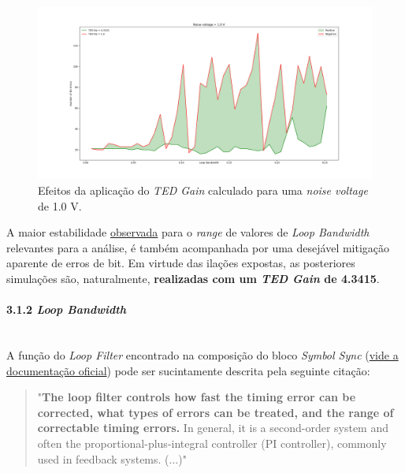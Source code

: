 
\begin{figure}[ht]
    \centering
    \includegraphics[width=0.85\linewidth]{img/intro/TEDGain_effect.png} 
    \caption{Efeitos da aplicação do \textit{TED Gain} calculado para uma \textit{noise voltage} de 1.0 V.} 
    \label{fig:TEDGain-effect} 
\end{figure} 

A maior estabilidade \hyperref[fig:TEDGain-effect]{observada} para o \textit{range} de valores de \textit{Loop Bandwidth} relevantes para a análise\cite{symbolsync-gnuradio}, é também acompanhada por uma desejável mitigação aparente de erros de bit\footnotemark[6]. Em virtude das ilações expostas, as posteriores simulações são, naturalmente, \textbf{realizadas com um \textit{TED Gain} de 4.3415}.


\clearpage
\paragraph{3.1.2 \textit{Loop Bandwidth}}\mbox{}\\
A função do \textit{Loop Filter} encontrado na composição do bloco \textit{Symbol Sync} (\href{https://wiki.gnuradio.org/index.php/Symbol_Sync}{vide a documentação oficial}) pode ser sucintamente descrita pela seguinte citação:
\begin{quote}
    "\textbf{The loop filter controls how fast the timing error can be corrected, what types of errors can be treated, and the range of correctable timing errors.} In general, it is a second-order system and often the proportional-plus-integral controller (PI controller), commonly used in feedback systems. (...)"\cite{igor}
\end{quote}

